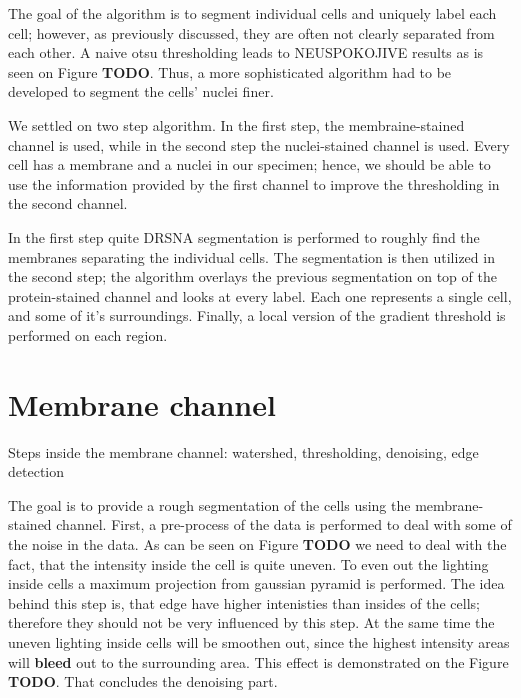 \documentclass[
  digital,     %
  oneside,     %
  nosansbold,  %
  nocolorbold, %
  lof,         %
  lot,         %
]{fithesis4}
\begin{document}

The goal of the algorithm is to segment individual cells and uniquely label each
cell; however, as previously discussed, they are often not clearly separated
from each other. A naive otsu thresholding leads to NEUSPOKOJIVE results as is
seen on Figure \textbf{TODO}. Thus, a more sophisticated algorithm had to be
developed to segment the cells' nuclei finer.

We settled on two step algorithm. In the first step, the membraine-stained
channel is used, while in the second step the nuclei-stained channel is used.
Every cell has a membrane and a nuclei in our specimen; hence, we should be able
to use the information provided by the first channel to improve the thresholding
in the second channel.

In the first step quite DRSNA segmentation is performed to roughly find the
membranes separating the individual cells. The segmentation is then utilized in
the second step; the algorithm overlays the previous segmentation on top of the
protein-stained channel and looks at every label. Each one represents a single
cell, and some of it's surroundings. Finally, a local version of the gradient 
threshold is performed on each region.




\section{Membrane channel}
Steps inside the membrane channel: watershed, thresholding, denoising, edge
detection

The goal is to provide a rough segmentation of the cells using the
membrane-stained channel. First, a pre-process of the data is performed to deal
with some of the noise in the data. As can be seen on Figure \textbf{TODO} we
need to deal with the fact, that the intensity inside the cell is quite uneven.
To even out the lighting inside cells a maximum projection from gaussian pyramid
is performed. The idea behind this step is, that edge have higher intenisties
than insides of the cells; therefore they should not be very influenced by this
step. At the same time the uneven lighting inside cells will be smoothen out,
since the highest intensity areas will \textbf{bleed} out to the surrounding
area. This effect is demonstrated on the Figure \textbf{TODO}. That concludes
the denoising part.
\end{document}
